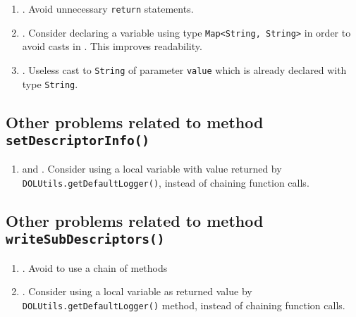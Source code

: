 \begin{enumerate}
	\item {}. Avoid unnecessary \texttt{return} statements.
	\item {}. Consider declaring a variable using type \texttt{Map<String, String>}  in order to avoid casts in . This improves readability.
	\item {}. Useless cast to \texttt{String} of parameter \texttt{value} which is already declared with type \texttt{String}.
\end{enumerate}

\subsection{Other problems related to method \texttt{setDescriptorInfo()}}
\begin{enumerate}
	\item {} and . Consider using a local variable with value returned by \break \texttt{DOLUtils.getDefaultLogger()}, instead of chaining function calls.
\end{enumerate}

\subsection{Other problems related to method \texttt{writeSubDescriptors()}}
\begin{enumerate}
\item {}. Avoid to use a chain of methods
\item {}. Consider using a local variable as returned value by \texttt{DOLUtils.getDefaultLogger()} method, instead of chaining function calls.
\end{enumerate}
